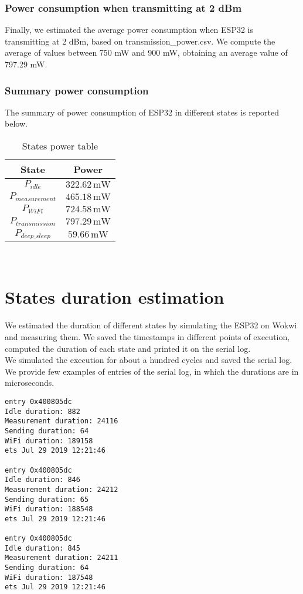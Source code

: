\subsubsection{Power consumption when transmitting at 2 dBm}
Finally, we estimated the average power consumption when ESP32 is transmitting at 2 dBm, based on transmission\_power.csv. We compute the average of values between 750 mW and 900 mW, obtaining an average value of 797.29 mW.

\subsubsection{Summary power consumption}
The summary of power consumption of ESP32 in different states is reported below.

\begin{table}[H]
\centering 
\begin{tabular}{| c | c |}
	\hline 
	\rowcolor{bluepoli!40}
	\textbf{State} & \textbf{Power}\T\B \\
	\hline 
	$P_{idle}$ & $322.62\,\text{mW}$ \T\B\\
	$P_{measurement}$ & $465.18\,\text{mW}$ \T\B\\
	$P_{WiFi}$ & $724.58\,\text{mW}$ \T\B\\
	$P_{transmission}$ & $797.29\,\text{mW}$ \T\B\\
	$P_{deep\_sleep}$  & $59.66\,\text{mW}$ \T\B\\
	\hline
\end{tabular}
\\[10pt]
\caption{States power table}
\label{table:states_power_table}
\end{table}

\section{States duration estimation}
We estimated the duration of different states by simulating the ESP32 on Wokwi and measuring them. We saved the timestamps in different points of execution, computed the duration of each state and printed it on the serial log.\\
We simulated the execution for about a hundred cycles and saved the serial log. We provide few examples of entries of the serial log, in which the durations are in microseconds.

\begin{verbatim}
entry 0x400805dc
Idle duration: 882
Measurement duration: 24116
Sending duration: 64
WiFi duration: 189158
ets Jul 29 2019 12:21:46

entry 0x400805dc
Idle duration: 846
Measurement duration: 24212
Sending duration: 65
WiFi duration: 188548
ets Jul 29 2019 12:21:46

entry 0x400805dc
Idle duration: 845
Measurement duration: 24211
Sending duration: 64
WiFi duration: 187548
ets Jul 29 2019 12:21:46
\end{verbatim}


